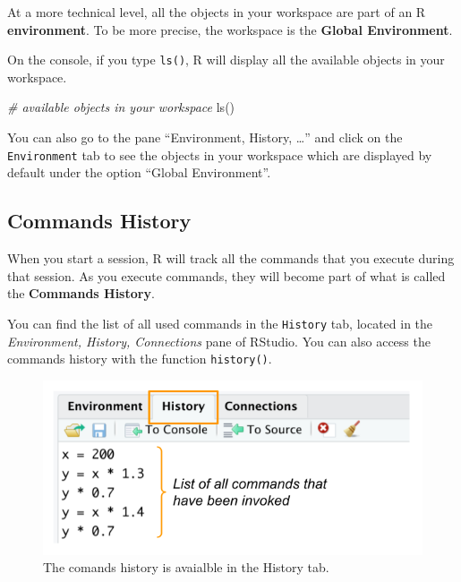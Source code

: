 \documentclass[
]{book}
\newenvironment{Shaded}{\begin{snugshade}}{\end{snugshade}}
\newcommand{\CommentTok}[1]{\textcolor[rgb]{0.56,0.35,0.01}{\textit{#1}}}
\newcommand{\FunctionTok}[1]{\textcolor[rgb]{0.00,0.00,0.00}{#1}}
\newcommand{\NormalTok}[1]{#1}
\begin{document}
At a more technical level, all the objects in your workspace are part of an R
\textbf{environment}. To be more precise, the workspace is the \textbf{Global Environment}.

On the console, if you type \texttt{ls()}, R will display all the available objects
in your workspace.

\begin{Shaded}
\begin{Highlighting}[]
\CommentTok{\# available objects in your workspace}
\FunctionTok{ls}\NormalTok{()}
\end{Highlighting}
\end{Shaded}

You can also go to the pane ``Environment, History, \ldots{}'' and
click on the \texttt{Environment} tab to see the objects in your workspace which are
displayed by default under the option ``Global Environment''.

\hypertarget{commands-history}{%
\subsection{Commands History}\label{commands-history}}

When you start a session, R will track all the commands that you execute during
that session. As you execute commands, they will become part of what is called
the \textbf{Commands History}.

You can find the list of all used commands in the \texttt{History} tab,
located in the \emph{Environment, History, Connections} pane of RStudio. You can
also access the commands history with the function \texttt{history()}.

\begin{figure}

{\centering \includegraphics[width=0.65\linewidth]{images/rstudio/rstudio-history-tab} 

}

\caption{The comands history is avaialble in the History tab.}\label{fig:unnamed-chunk-33}
\end{figure}
\end{document}
